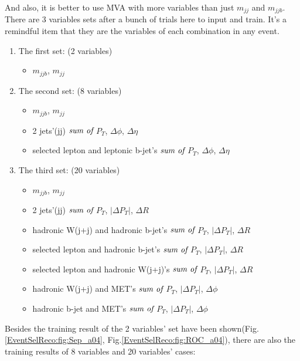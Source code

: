 			And also, it is better to use MVA with more variables than just $m_{jj}$ and $m_{jjb}$. There are 3 variables sets after a bunch of trials here to input and train. It's a remindful item that they are the variables of each combination in any event.

			\begin{enumerate}
			\item The first set: (2 variables)
				\begin{itemize}
				\item $m_{jjb}$, $m_{jj}$
				\end{itemize}

			\item The second set: (8 variables)
				\begin{itemize}
				\item $m_{jjb}$, $m_{jj}$
				\item 2 jets'(jj) $\emph{sum of}$ $P_{T}$, $\Delta \phi$, $\Delta \eta$
				\item selected lepton and leptonic b-jet's $\emph{sum of}$ $P_{T}$, $\Delta \phi$, $\Delta \eta$ 
				\end{itemize}

			\item The third set: (20 variables)
				\begin{itemize}
				\item $m_{jjb}$, $m_{jj}$
				\item 2 jets'(jj) $\emph{sum of}$ $P_{T}$, $|\Delta P_{T}|$, $\Delta R$
				\item hadronic W(j+j) and hadronic b-jet's $\emph{sum of}$ $P_{T}$, $|\Delta P_{T}|$, $\Delta R$
				\item selected lepton and hadronic b-jet's $\emph{sum of}$ $P_{T}$, $|\Delta P_{T}|$, $\Delta R$
				\item selected lepton and hadronic W(j+j)'s $\emph{sum of}$ $P_{T}$, $|\Delta P_{T}|$, $\Delta R$
				\item hadronic W(j+j) and MET's $\emph{sum of}$ $P_{T}$, $|\Delta P_{T}|$, $\Delta \phi$
				\item hadronic b-jet and MET's $\emph{sum of}$ $P_{T}$, $|\Delta P_{T}|$, $\Delta \phi$
				\end{itemize}
			\end{enumerate}

			Besides the training result of the 2 variables' set have been shown(Fig.\ref{EventSelReco:fig:Sep_a04}, Fig.\ref{EventSelReco:fig:ROC_a04}), there are also the training results of 8 variables and 20 variables' cases:

